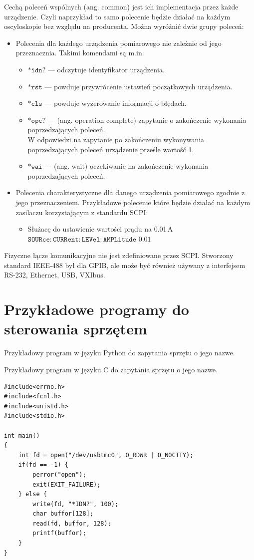 \documentclass[a4paper, portrait,12pt]{report}
\begin{document}
Cechą  poleceń  wspólnych  (ang.  common)  jest  ich  implementacja  przez  każde urządzenie. Czyli naprzykład to samo polecenie będzie działać na każdym oscyloskopie bez względu na producenta. Można wyróżnić dwie grupy poleceń:
\begin{itemize}
\item Polecenia dla każdego urządzenia pomiarowego nie zależnie od jego przeznacznia. Takimi komendami są m.in.
\begin{itemize}
\item $\mathtt{*idn?}$ --- odczytuje identyfikator urządzenia. 
\item $\mathtt{*rst}$ --- powduje przywrócenie ustawień początkowych urządzenia.
\item $\mathtt{*cls}$ --- powduje wyzerowanie informacji o błędach.
\item $\mathtt{*opc?}$  --- (ang.  operation  complete)  zapytanie  o  zakończenie  wykonania
poprzedzających poleceń. \\
W  odpowiedzi  na  zapytanie  po  zakończeniu  wykonywania  poprzedzających poleceń urządzenie prześle wartość 1.
\item $\mathtt{*wai}$ ---  (ang.  wait)  oczekiwanie  na  zakończenie  wykonania  poprzedzających poleceń.
\end{itemize}

\item Polecenia charakterystyczne dla danego urządzenia pomiarowego zgodnie z jego przeznaczeniem. Przykładowe polecenie które będzie działać na każdym zasilaczu korzystającym z standardu SCPI:
\begin{itemize}
\item Służacę do ustawienie wartości prądu na 0.01\,A \\ $\mathtt{SOURce:CURRent:LEVel:AMPLitude}$  $\mathtt{0.01}$
\end{itemize}
\end{itemize}

Fizyczne łącze komunikacyjne nie jest zdefiniowane przez SCPI. Stworzony standard IEEE-488 był dla GPIB, ale może być również używany z interfejsem RS-232, Ethernet, USB, VXIbus.
\newpage
\section{Przykładowe programy do sterowania sprzętem}
Przykładowy program w języku Python do zapytania sprzętu o jego nazwe.

Przykładowy program w języku C do zapytania sprzętu o jego nazwe.
\begin{lstlisting}
#include<errno.h>
#include<fcnl.h>
#include<unistd.h>
#include<stdio.h>

int main()
{
    int fd = open("/dev/usbtmc0", O_RDWR | O_NOCTTY);
    if(fd == -1) {
        perror("open");
        exit(EXIT_FAILURE);
    } else {
        write(fd, "*IDN?", 100);
        char buffor[128];
        read(fd, buffor, 128);
        printf(buffor);
    }
}

\end{lstlisting}
\end{document}
